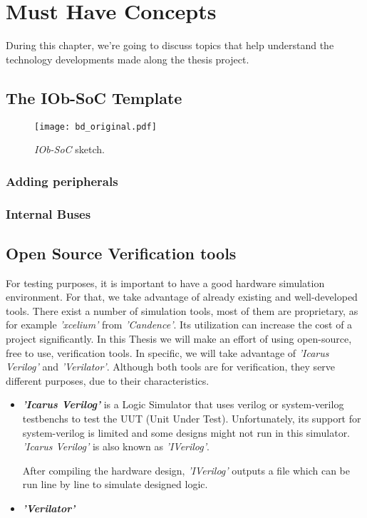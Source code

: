 \chapter{Must Have Concepts}
During this chapter, we're going to discuss topics that help understand the technology developments made along the thesis project.

\section{The IOb-SoC Template}
\label{section:the_iob_soc_template}

\begin{figure}[!h]
    \centering
    \texttt{[image: bd\_original.pdf]}
    \caption{\textit{IOb-SoC} sketch.}
    \label{fig:bd_original}
\end{figure}

\subsection{Adding peripherals}
\subsection{Internal Buses}

\section{Open Source Verification tools}
For testing purposes, it is important to have a good hardware simulation environment. For that, we take advantage of already existing and well-developed tools. There exist a number of simulation tools, most of them are proprietary, as for example \textit{'xcelium'} from \textit{'Candence'}. Its utilization can increase the cost of a project significantly. In this Thesis we will make an effort of using open-source, free to use, verification tools. In specific, we will take advantage of \textit{'Icarus Verilog'} and \textit{'Verilator'}. Although both tools are for verification, they serve different purposes, due to their characteristics.

\begin{itemize}
    \item \textbf{\textit{'Icarus Verilog'}} is a Logic Simulator that uses verilog or system-verilog testbenchs to test the UUT (Unit Under Test). Unfortunately, its support for system-verilog is limited and some designs might not run in this simulator. \textit{'Icarus Verilog'} is also known as \textit{'IVerilog'}.
    
    After compiling the hardware design, \textit{'IVerilog'} outputs a file which can be run line by line to simulate designed logic.
    
    \item \textbf{\textit{'Verilator'}}
\end{itemize}

